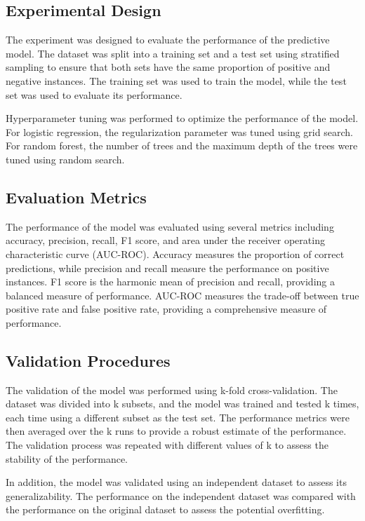 \documentclass[conference]{IEEEtran}
\begin{document}
\subsection{Experimental Design}

The experiment was designed to evaluate the performance of the predictive model. The dataset was split into a training set and a test set using stratified sampling to ensure that both sets have the same proportion of positive and negative instances. The training set was used to train the model, while the test set was used to evaluate its performance.

Hyperparameter tuning was performed to optimize the performance of the model. For logistic regression, the regularization parameter was tuned using grid search. For random forest, the number of trees and the maximum depth of the trees were tuned using random search.

\subsection{Evaluation Metrics}

The performance of the model was evaluated using several metrics including accuracy, precision, recall, F1 score, and area under the receiver operating characteristic curve (AUC-ROC). Accuracy measures the proportion of correct predictions, while precision and recall measure the performance on positive instances. F1 score is the harmonic mean of precision and recall, providing a balanced measure of performance. AUC-ROC measures the trade-off between true positive rate and false positive rate, providing a comprehensive measure of performance.

\subsection{Validation Procedures}

The validation of the model was performed using k-fold cross-validation. The dataset was divided into k subsets, and the model was trained and tested k times, each time using a different subset as the test set. The performance metrics were then averaged over the k runs to provide a robust estimate of the performance. The validation process was repeated with different values of k to assess the stability of the performance. 

In addition, the model was validated using an independent dataset to assess its generalizability. The performance on the independent dataset was compared with the performance on the original dataset to assess the potential overfitting. 
\end{document}
